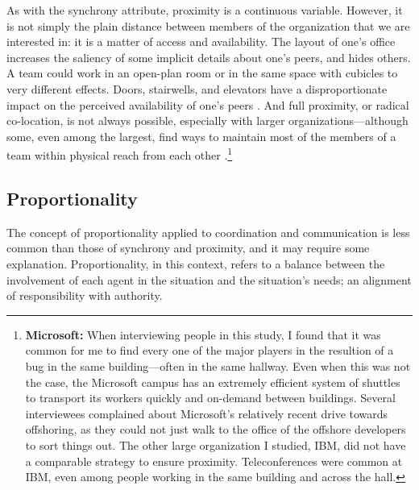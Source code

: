 As with the synchrony attribute, proximity is a continuous variable. However, it is not simply the plain distance between members of the organization that we are interested in: it is a matter of access and availability. The layout of one's office increases the saliency of some implicit details about one's peers, and hides others. A team could work in an open-plan room or in the same space with cubicles to very different effects. Doors, stairwells, and elevators have a disproportionate impact on the perceived availability of one's peers \cite{Allen1977}. And full proximity, or radical co-location, is not always possible, especially with larger organizations---although some, even among the largest, find ways to maintain most of the members of a team within physical reach from each other \cite{Bird2009}.\footnote{\textbf{Microsoft:} When interviewing people in this study, I found that it was common for me to find every one of the major players in the resultion of a bug in the same building---often in the same hallway. Even when this was not the case, the Microsoft campus has an extremely efficient system of shuttles to transport its workers quickly and on-demand between buildings. Several interviewees complained about Microsoft's relatively recent drive towards offshoring, as they could not just walk to the office of the offshore developers to sort things out. The other large organization I studied, IBM, did not have a comparable strategy to ensure proximity. Teleconferences were common at IBM, even among people working in the same building and across the hall.}


\subsection{Proportionality}

The concept of proportionality applied to coordination and communication is less common than those of synchrony and proximity, and it may require some explanation. Proportionality, in this context, refers to a balance between the involvement of each agent in the situation and the situation's needs; an alignment of responsibility with authority.

